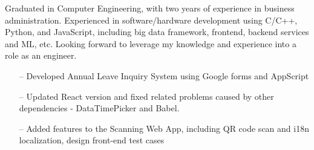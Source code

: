 \documentclass[10pt,a4paper]{altacv}
\begin{document}
\tagline{}

%

\begin{fullwidth}
\makecvheader
\end{fullwidth}

%



{Graduated in Computer Engineering, with two years of experience in business administration. Experienced in software/hardware development using C/C++, Python, and JavaScript, including big data framework, frontend, backend services and ML, etc. Looking forward to leverage my knowledge and experience into a role as an engineer. }


\medskip





\begin{itemize}
    \setlength{\itemindent}{0.5em}
    \item[--]   \small{Developed Annual Leave Inquiry System using Google forms and AppScript}
    \item[--]   \small{Updated React version and fixed related problems caused by other dependencies - DataTimePicker and Babel.}
    \item[--]   \small{Added features to the Scanning Web App, including QR code scan and i18n localization, design front-end test cases}
\end{itemize}

\medskip


\end{document}
